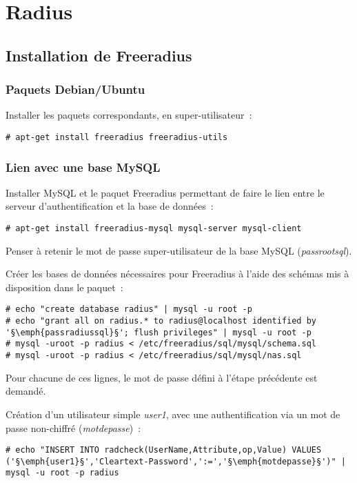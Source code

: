 \section{Radius}
\subsection{Installation de Freeradius}
\subsubsection{Paquets Debian/Ubuntu}

Installer les paquets correspondants, en super-utilisateur~:

\begin{lstlisting}
# apt-get install freeradius freeradius-utils
\end{lstlisting}

\subsubsection{Lien avec une base MySQL}

Installer MySQL et le paquet Freeradius permettant de faire le lien entre le serveur d'authentification et la base de données~:

\begin{lstlisting}
# apt-get install freeradius-mysql mysql-server mysql-client
\end{lstlisting}

Penser à retenir le mot de passe super-utilisateur de la base MySQL (\emph{passrootsql}).

Créer les bases de données nécessaires pour Freeradius à l'aide des schémas mis à disposition dans le paquet~:

\begin{lstlisting}
# echo "create database radius" | mysql -u root -p
# echo "grant all on radius.* to radius@localhost identified by '§\emph{passradiussql}§'; flush privileges" | mysql -u root -p
# mysql -uroot -p radius < /etc/freeradius/sql/mysql/schema.sql
# mysql -uroot -p radius < /etc/freeradius/sql/mysql/nas.sql
\end{lstlisting}

Pour chacune de ces lignes, le mot de passe défini à l'étape précédente est demandé.

Création d'un utilisateur simple \emph{user1}, avec une authentification via un mot de passe non-chiffré (\emph{motdepasse})~:

\begin{lstlisting}
# echo "INSERT INTO radcheck(UserName,Attribute,op,Value) VALUES ('§\emph{user1}§','Cleartext-Password',':=','§\emph{motdepasse}§')" | mysql -u root -p radius
\end{lstlisting}

